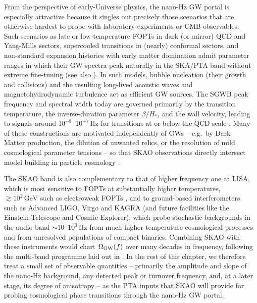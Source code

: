 \documentclass[a4paper,11pt]{article}
\begin{document}
From the perspective of early-Universe physics, the nano-Hz GW portal is especially
attractive because it singles out precisely those scenarios that are otherwise hardest 
to probe with laboratory experiments or CMB observables. Such scenarios as late or 
low-temperature FOPTs in dark (or mirror) QCD and Yang-Mills sectors, supercooled
transitions in (nearly) conformal sectors, and non-standard expansion histories with 
early matter domination admit parameter ranges in which their GW spectra peak naturally 
in the SKA/PTA band without extreme fine-tuning \citep{Goncalves:2025uwh,Zu:2024mirror,Schwaller:2015PRL,Addazi:2018ctp,Aoki:2017,Morgante:2023} 
(see also \citep{Caprini:2018csg}). In such models, bubble nucleation (their growth
and collisions) and the resulting long-lived acoustic waves and magnetohydrodynamic
turbulence act as efficient GW sources. The SGWB peak frequency and spectral width today
are governed primarily by the transition temperature, the inverse-duration parameter
$\beta/H_*$, and the wall velocity, leading to signals around $10^{-8}$–$10^{-7}\,\mathrm{Hz}$ 
for transitions at or below the QCD scale \citep{Caprini:2018csg,Hindmarsh:2017}. Many of these 
constructions are motivated independently of GWs -- e.g.~by Dark Matter production, the dilution 
of unwanted relics, or the resolution of mild cosmological parameter tensions -- so that SKAO 
observations directly intersect model building in particle cosmology \citep{Caldwell:2022DEUGW,Bian:2025GWcosmology,Roshan:2025FirstSecond}. 

The SKAO band is also complementary to that of higher frequency one at LISA, which is most 
sensitive to FOPTs at substantially higher temperatures, $\gtrsim 10^2\,\mathrm{GeV}$ such 
as electroweak FOPTs \citep{Caprini:2020pt}, and to ground-based interferometers such as 
Advanced LIGO, Virgo and KAGRA (and future facilities like the Einstein Telescope and Cosmic 
Explorer), which probe stochastic backgrounds in the audio band $\sim 10$–$10^3\,\mathrm{Hz}$ 
from much higher-temperature cosmological processes and from unresolved populations of compact
binaries. Combining SKAO with these instruments would chart $\Omega_{\rm GW}(f)$ over many
decades in frequency, following the multi-band programme laid out in \citet{Lasky:2016PRX}.
In the rest of this chapter, we therefore treat a small set of observable quantities -- primarily 
the amplitude and slope of the nano-Hz background, any detected peak or turnover frequency, and, 
at a later stage, its degree of anisotropy -- as the PTA inputs that SKAO will provide for probing
cosmological phase transitions through the nano-Hz GW portal.
\end{document}
